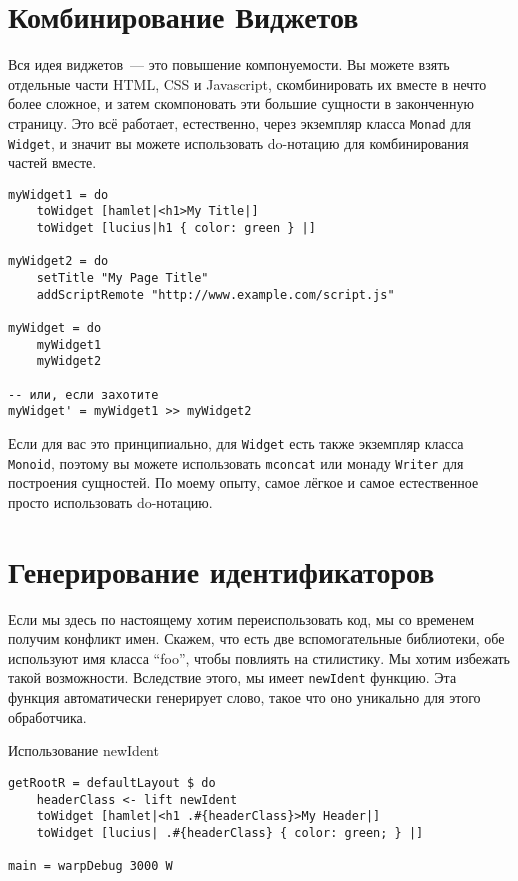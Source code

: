 \section{Комбинирование Виджетов}
Вся идея виджетов~--- это повышение компонуемости. Вы можете взять отдельные части HTML, CSS и Javascript, скомбинировать их вместе в нечто более сложное, и затем скомпоновать эти большие сущности в законченную страницу. Это всё работает, естественно, через экземпляр класса \lstinline'Monad' для \lstinline'Widget', и значит вы можете использовать do-нотацию для комбинирования частей вместе.
\begin{lstlisting}[title={Комбинирование Виджетов}]
myWidget1 = do
    toWidget [hamlet|<h1>My Title|]
    toWidget [lucius|h1 { color: green } |]

myWidget2 = do
    setTitle "My Page Title"
    addScriptRemote "http://www.example.com/script.js"

myWidget = do
    myWidget1
    myWidget2

-- или, если захотите
myWidget' = myWidget1 >> myWidget2
\end{lstlisting}
\begin{remark}
Если для вас это принципиально, для \lstinline'Widget' есть также экземпляр класса \lstinline'Monoid', поэтому вы можете использовать \lstinline'mconcat' или монаду \lstinline'Writer' для построения сущностей. По моему опыту, самое лёгкое и самое естественное просто использовать do-нотацию.
\end{remark}

\section{Генерирование идентификаторов}

Если мы здесь по настоящему хотим переиспользовать код, мы со временем получим конфликт имен. Скажем, что есть две вспомогательные библиотеки, обе используют имя класса \textquotedblleft foo\textquotedblright, чтобы повлиять на стилистику. Мы хотим избежать такой возможности. Вследствие этого, мы имеет \lstinline'newIdent' функцию.  Эта функция автоматически генерирует слово, такое что оно уникально для этого обработчика.

Использование newIdent

\begin{lstlisting}
getRootR = defaultLayout $ do
    headerClass <- lift newIdent
    toWidget [hamlet|<h1 .#{headerClass}>My Header|]
    toWidget [lucius| .#{headerClass} { color: green; } |]

main = warpDebug 3000 W
\end{lstlisting}

